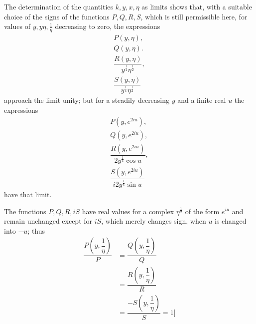 The determination of the quantities $k,\allowbreak y,\allowbreak x,\allowbreak \eta$ as limits shows that, with a suitable choice of the signs of the functions $P,\allowbreak Q,\allowbreak R,\allowbreak S$, which is still permissible here, for values of $y,\allowbreak y\eta,\allowbreak \frac1\eta$ decreasing to zero, the expressions
\[
\begin{gathered}P(y,\eta),\\[6pt] Q(y,\eta).\\[6pt]
\dfrac{R(y,\eta)}{y^{\frac14}\eta^{\frac12}},\\[6pt]
\dfrac{S(y,\eta)}{y^{\frac14}\eta^{\frac12}}\end{gathered}
\]
approach the limit unity; but for a steadily decreasing $y$ and a finite real $u$ the expressions
\[
\begin{gathered}P(y,e^{2iu}),\\[6pt] Q(y,e^{2iu}),\\[6pt]
\dfrac{R(y,e^{2iu})}{2y^{\frac14}\cos u},\\[6pt]
\dfrac{S(y,e^{2iu})}{i2y^{\frac14}\sin u}\end{gathered}
\]
have that limit.

The functions $P,\allowbreak Q,\allowbreak R,\allowbreak iS$ have real values for a complex $\eta^{\frac12}$ of the form $e^{iu}$ and remain unchanged except for $iS$, which merely changes sign, when $u$ is changed into $-u$; thus
\[
\begin{aligned}\dfrac{P(y,\dfrac1\eta)}P
&=\dfrac{Q(y,\dfrac1\eta)}Q
\\[7pt]&=\dfrac{R(y,\dfrac1\eta)}R
\\[7pt]&=\dfrac{-S(y,\dfrac1\eta)}S=1
\text{]}\end{aligned}
\]

\clearpage
\endgroup
